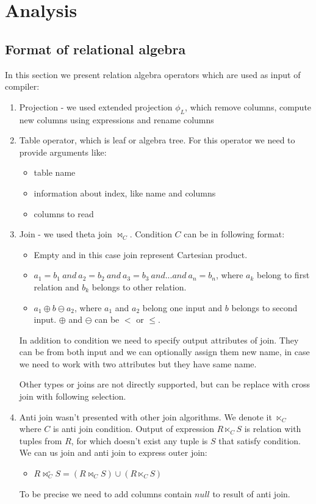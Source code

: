 \chapter{Analysis}

\section{Format of relational algebra}

In this section we present relation algebra operators which are used as input of compiler:
\begin{enumerate}
\item Projection - we used extended projection $\phi_L$, which remove columns, compute new columns using expressions and rename columns

\item Table operator, which is leaf or algebra tree. For this operator we need to provide arguments like:
\begin{itemize}
\item table name
\item information about index, like name and columns
\item columns to read
\end{itemize}
\item Join - we used theta join $\Join_C$. Condition $C$ can be in following format:
\begin{itemize}
\item Empty and in this case join represent Cartesian product.
\item $a_1=b_1~and~a_2=b_2~and~a_3=b_3~and...and~a_n=b_n$, where $a_k$ belong to first relation and $b_k$ belongs to other relation.
\item $a_1\oplus b \ominus a_2$, where $a_1$ and $a_2$ belong one input and $b$ belongs to second input. $\oplus$ and $\ominus$ can be $<$ or $\leq$.

\end{itemize}

In addition to condition we need to specify output attributes of join. They can be from both input and we can optionally assign them new name, in case we need to work with two attributes but they have same name.

Other types or joins are not directly supported, but can be replace with cross join with following selection.
\item Anti join wasn't presented with other join algorithms. We denote it $\ltimes_C$ where $C$ is anti join condition. Output of expression $R \ltimes_C S$ is relation with tuples from $R$, for which doesn't exist any tuple is $S$ that satisfy condition. We can us join and anti join to express outer join:
\begin{itemize}
\item 
 $R\Join^\circ_C S= (R\Join_C S)\cup (R\ltimes_C S)$
\end{itemize}
To be precise we need to add columns contain $null$ to result of anti join.
 

\end{enumerate}
